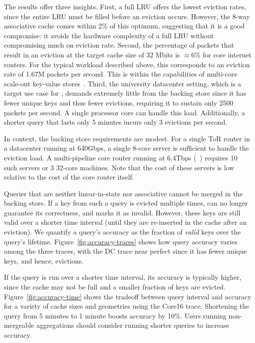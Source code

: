 The results offer three insights. First, a full LRU offers the lowest eviction
rates, since the entire LRU must be filled before an eviction occurs. However,
the 8-way associative cache comes within 2\% of this optimum, suggesting that it
is a good compromise: it avoids the hardware complexity of a full LRU without
compromising much on eviction rate. 
Second, the percentage of packets that result in an eviction at the target cache size of 32 Mbits is $\approx6\%$ for core internet routers. For the typical workload described above, this corresponds to an eviction rate of 1.67M packets per second. This is within the capabilities of multi-core scale-out key-value stores~\cite{redis_benchmark, memcached_benchmark, redis_vs_memcached, redis_vs_memcached_update}.
Third, the university datacenter setting, which is a target use case for \TheSystem,
demands extremely little from the backing store since it has fewer unique keys
and thus fewer evictions, requiring it to sustain only 2500 packets per
second. A single processor core can handle this load. Additionally, a shorter
query that lasts only 5 minutes incurs only 3 evictions per second.

In context, the backing store requirements are modest. For a single ToR router in a datacenter running at 640Gbps, a single 8-core server is sufficient to handle the eviction load. A multi-pipeline core router running at 6.4Tbps (\eg~\cite{tofino}) requires 10 such servers or 3 32-core machines. Note that the cost of these servers is low relative to the cost of the core router itself.

Queries that are neither linear-in-state nor associative cannot be merged in the
backing store. If a key from such a query is evicted multiple times, \TheSystem
can no longer guarantee its correctness, and marks it as invalid. However, these
keys are still valid over a shorter time interval (until they are re-inserted in the
cache after an eviction). We quantify a query's accuracy as the fraction
of \emph{valid} keys over the query's lifetime. Figure~\ref{fig:accuracy-traces}
shows how query accuracy varies among the three traces, with the DC trace
near perfect since it has fewer unique keys, and hence, evictions.

If the query is run over a shorter time interval, its accuracy is typically higher, since the cache may not be full and a smaller fraction of keys are evicted. 
Figure~\ref{fig:accuracy-time} shows the tradeoff between query interval and accuracy for a variety of cache sizes and geometries using the Core16 trace.
Shortening the query from 5 minutes to 1 minute boosts accuracy by 10\%. Users running non-mergeable aggregations should consider running shorter queries to increase accuracy.

